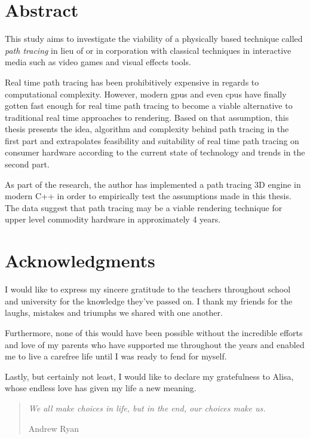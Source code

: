 \documentclass[
  twoside,
  11pt, a4paper,
  footinclude=true,
  headinclude=true,
  cleardoublepage=empty
]{scrreprt}
\begin{document}


\chapter*{Abstract}
\onehalfspace
This study aims to investigate the viability of a physically based technique called
\emph{path tracing} in lieu of or in corporation with classical techniques in interactive media
such as video games and visual effects tools.

Real time path tracing has been prohibitively expensive in regards to computational complexity.
However, modern \acs{gpu}s and even \acs{cpu}s have finally gotten fast enough for real time path
tracing to become a viable alternative to traditional real time approaches to rendering.  Based on
that assumption, this thesis presents the idea, algorithm and complexity behind path tracing in the
first part and extrapolates feasibility and suitability of real time path tracing on consumer
hardware according to the current state of technology and trends in the second part.

As part of the research, the author has implemented a path tracing 3D engine in modern C++ in order
to empirically test the assumptions made in this thesis. The data suggest that  path tracing may be a
viable rendering technique for upper level commodity hardware in approximately 4 years.
\singlespace

\chapter*{Acknowledgments}
\doublespacing
I would like to express my sincere gratitude to the teachers throughout school and university for
the knowledge they've passed on.
I thank my friends for the laughs, mistakes and triumphs we shared with one another.

Furthermore, none of this would have been possible without the incredible efforts and love of my
parents who have supported me throughout the years and enabled me to live a carefree life until I
was ready to fend for myself.

Lastly, but certainly not least, I would like to declare my gratefulness to Alisa, whose endless love
has given my life a new meaning.

\singlespace

\clearpage
\vspace*{\fill}
\thispagestyle{empty} %
\begin{quotation}
    \em
    We all make choices in life, but in the end, our choices make us.

    \medskip
    \raggedleft
    Andrew Ryan
\end{quotation}
\vspace*{\fill}
\end{document}
